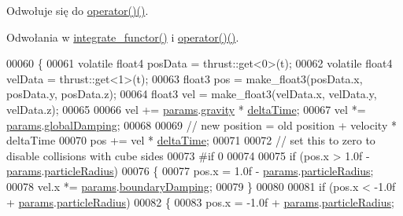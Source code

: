 Odwołuje się do \hyperlink{particles__kernel__impl_8cuh_source_l00059}{operator()()}.



Odwołania w \hyperlink{particles__kernel__impl_8cuh_source_l00051}{integrate\-\_\-functor()} i \hyperlink{particles__kernel__impl_8cuh_source_l00059}{operator()()}.


\begin{DoxyCode}
00060     \{
00061         \textcolor{keyword}{volatile} float4 posData = thrust::get<0>(t);
00062         \textcolor{keyword}{volatile} float4 velData = thrust::get<1>(t);
00063         float3 pos = make\_float3(posData.x, posData.y, posData.z);
00064         float3 vel = make\_float3(velData.x, velData.y, velData.z);
00065 
00066         vel += \hyperlink{particles__kernel__impl_8cuh_a8db8938e28edd17862daf58651051bdc}{params}.\hyperlink{struct_sim_params_ae7508eba5dd90859215b59d19e001bb9}{gravity} * \hyperlink{structintegrate__functor_a06dce1826719cd5b2a9fdd9f566da754}{deltaTime};
00067         vel *= \hyperlink{particles__kernel__impl_8cuh_a8db8938e28edd17862daf58651051bdc}{params}.\hyperlink{struct_sim_params_a7058bad8c867d9d42d8c9d842638ebea}{globalDamping};
00068 
00069         \textcolor{comment}{// new position = old position + velocity * deltaTime}
00070         pos += vel * \hyperlink{structintegrate__functor_a06dce1826719cd5b2a9fdd9f566da754}{deltaTime};
00071 
00072         \textcolor{comment}{// set this to zero to disable collisions with cube sides}
00073 \textcolor{preprocessor}{#if 0}
00074 \textcolor{preprocessor}{}
00075         \textcolor{keywordflow}{if} (pos.x > 1.0f - \hyperlink{particles__kernel__impl_8cuh_a8db8938e28edd17862daf58651051bdc}{params}.\hyperlink{struct_sim_params_a7e131c24e1020c44173deb0f57a8c4af}{particleRadius})
00076         \{
00077             pos.x = 1.0f - \hyperlink{particles__kernel__impl_8cuh_a8db8938e28edd17862daf58651051bdc}{params}.\hyperlink{struct_sim_params_a7e131c24e1020c44173deb0f57a8c4af}{particleRadius};
00078             vel.x *= \hyperlink{particles__kernel__impl_8cuh_a8db8938e28edd17862daf58651051bdc}{params}.\hyperlink{struct_sim_params_a4da0c7593d6569e48ee50e7d0c7576f9}{boundaryDamping};
00079         \}
00080 
00081         \textcolor{keywordflow}{if} (pos.x < -1.0f + \hyperlink{particles__kernel__impl_8cuh_a8db8938e28edd17862daf58651051bdc}{params}.\hyperlink{struct_sim_params_a7e131c24e1020c44173deb0f57a8c4af}{particleRadius})
00082         \{
00083             pos.x = -1.0f + \hyperlink{particles__kernel__impl_8cuh_a8db8938e28edd17862daf58651051bdc}{params}.\hyperlink{struct_sim_params_a7e131c24e1020c44173deb0f57a8c4af}{particleRadius};

\end{DoxyCode}
